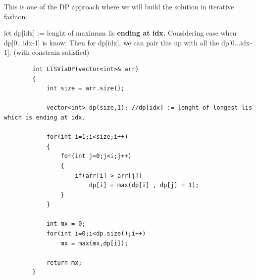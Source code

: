\begin{solution}
    \obeylines
    \obeyspaces
    This is one of the DP approach where we will build the solution in iterative fashion.

    let dp[idx] := lenght of maximum lis \textbf{ending at idx.}
    \medskip
    Considering case when dp[0...idx-1] is know:
    Then for dp[idx], we can pair this up with all the dp[0...idx-1]. (with constrain satisfied)

    \begin{verbatim}
        int LISViaDP(vector<int>& arr)
        {
            int size = arr.size();
            
            vector<int> dp(size,1); //dp[idx] := lenght of longest lis which is ending at idx.
            
            for(int i=1;i<size;i++)
            {
                for(int j=0;j<i;j++)
                {
                    if(arr[i] > arr[j])
                        dp[i] = max(dp[i] , dp[j] + 1);
                }
            }
            
            int mx = 0;
            for(int i=0;i<dp.size();i++)
                mx = max(mx,dp[i]); 
            
            return mx;
        }
    \end{verbatim}
    

\end{solution}

